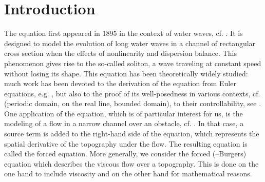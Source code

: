 
\section{Introduction}

The \KdV equation first appeared in 1895 in the context of water waves, cf. \cite{korteweg1895xli}. It is designed to model the evolution of long water waves in a channel of rectangular cross section when the effects of nonlinearity and dispersion balance. This phenomenon gives rise to the so-called soliton, a wave traveling at constant speed without losing its shape. This equation has been theoretically widely studied: much work has been devoted to the derivation of the equation from Euler equations, e.g. \cite{shen1992forced,constantin2008,su2003korteweg}, but also to the proof of its well-posedness in various contexts, cf. \cite{miura1976korteweg,kenig1993,bourgain1997periodic} (periodic domain, on the real line, bounded domain), to their controllability, see \cite{rosier1997exact,glass2008some,coron2003exact,chapouly2009global}.
One application of the \KdV equation, which is of particular interest for us, is the modeling of a flow in a narrow channel over an obstacle, cf. \cite{milewski2004forced,shen1992forced,shen1996accuracy}. %
In that case, a source term is added to the right-hand side of the \KdV equation, which represents the spatial derivative of the topography under the flow. The resulting equation is called the forced \KdV equation. More generally, we consider the forced \KdVB (\KdV--Burgers) equation which describes the viscous flow over a topography. This is done on the one hand to include viscosity and on the other hand for mathematical reasons.      %
